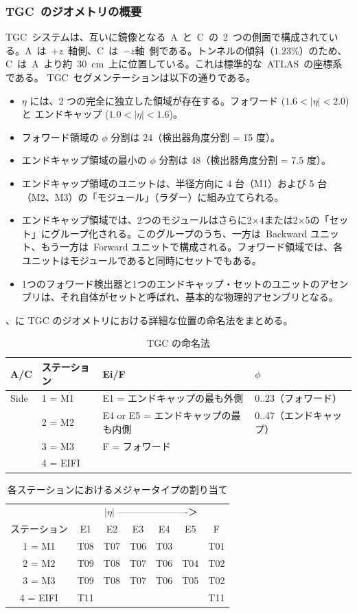 \subsubsection{TGC~のジオメトリの概要}
TGC~システムは、互いに鏡像となる~A~と~C~の~2~つの側面で構成されている。A~は~$+z$~軸側、C~は~$-z$軸~側である。トンネルの傾斜（$1.23\%$）のため、C~は~A~より約~30~cm~上に位置している。これは標準的な~ATLAS~の座標系である。
TGC~セグメンテーションは以下の通りである。
\begin{itemize}
    \item $\eta$ には、2 つの完全に独立した領域が存在する。フォワード ($1.6<|\eta|<2.0$) と エンドキャップ ($1.0<|\eta|<1.6$)。
    \item フォワード領域の $\phi$ 分割は 24（検出器角度分割 = 15 度）。
    \item エンドキャップ領域の最小の $\phi$ 分割は 48（検出器角度分割 = 7.5 度）。
    \item エンドキャップ領域のユニットは、半径方向に 4 台（M1）および 5 台（M2、M3）の「モジュール」（ラダー）に組み立てられる。
    \item エンドキャップ領域では、2つのモジュールはさらに2×4または2×5の「セット」にグループ化される。このグループのうち、一方は~Backward ユニット、もう一方は~Forward ユニットで構成される。フォワード領域では、各ユニットはモジュールであると同時にセットでもある。
    \item 1つのフォワード検出器と1つのエンドキャップ・セットのユニットのアセンブリは、それ自体がセットと呼ばれ、基本的な物理的アセンブリとなる。
\end{itemize}
、に TGC のジオメトリにおける詳細な位置の命名法をまとめる。

\begin{table}[tb]
	\centering
	\begin{tabular}{llll}\hline
	A/C & ステーション & Ei/F & $\phi$ \\ \hline
	Side & 1 = M1  & E1 = エンドキャップの最も外側 & 0..23（フォワード）\\
	& 2 = M2 & E4 or E5 = エンドキャップの最も内側 & 0..47（エンドキャップ）\\
	& 3 = M3 & F = フォワード & \\
	& 4 = EIFI &&
	\end{tabular}
	\caption{TGC の命名法}
	\label{tb:tgcNaming}
\end{table}

\begin{table}[tb]
	\centering
	\begin{tabular}{c|cccccc}\hline
	& \multicolumn{6}{|c|}{$|\eta|$ ----------------------＞} \\
	ステーション & E1 & E2 & E3 & E4 & E5 & F \\ \hline
	1 = M1 & T08 & T07 & T06 & T03 & & T01 \\
	2 = M2 & T09 & T08 & T07 & T06 & T04 & T02 \\
	3 = M3 & T09 & T08 & T07 & T06 & T05 & T02 \\
	4 = EIFI & T11 &&&&& T11 \\
	\end{tabular}
	\caption{各ステーションにおけるメジャータイプの割り当て}
	\label{tb:4tgc}
\end{table}

